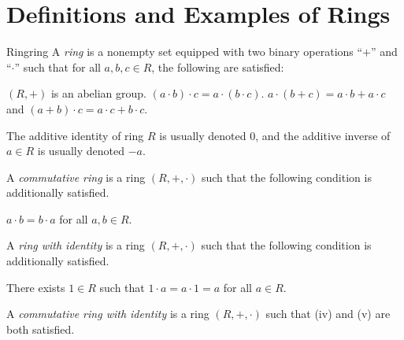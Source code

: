 \documentclass[../modern_algebra.tex]{subfiles}
\begin{document}
\section{Definitions and Examples of Rings}

\begin{Definition}[colbacktitle=red!75!black]{Ring}{ring}
    A \textit{ring} is a nonempty set equipped with two binary operations
    ``\(+\)'' and ``\(\cdot\)'' such that for all \(a, b, c \in R\), the following are
    satisfied:
    \begin{enumerate}[nolistsep, label=(\roman*)]
        \ii \((R, +)\) is an abelian group.
        \ii \((a \cdot b) \cdot c = a \cdot (b \cdot c)\).
        \ii \(a \cdot (b + c) = a \cdot b + a \cdot c\) and \((a + b) \cdot c = a \cdot c + b \cdot c\).
    \end{enumerate}
    The additive identity of ring \(R\) is usually denoted \(0\),
    and the additive inverse of \(a \in R\) is usually denoted \(-a\).

    \vspace*{1em}
    A \textit{commutative ring} is a ring \((R, +, \cdot)\) such that
    the following condition is additionally satisfied.
    \begin{enumerate}[nolistsep, label=(\roman*)]
        \setcounter{enumi}{3}
        \ii \(a \cdot b = b \cdot a\) for all \(a, b \in R\).
    \end{enumerate}
    \vspace*{1em}
    A \textit{ring with identity} is a ring \((R, +, \cdot)\) such that
    the following condition is additionally satisfied.
    \begin{enumerate}[nolistsep, label=(\roman*)]
        \setcounter{enumi}{4}
        \ii There exists \(1 \in R\) such that \(1 \cdot a = a \cdot 1 = a\) for all \(a \in R\).
    \end{enumerate}
    \vspace*{1em}
    A \textit{commutative ring with identity} is a ring \((R, +, \cdot)\)
    such that (iv) and (v) are both satisfied.
\end{Definition}
\end{document}
